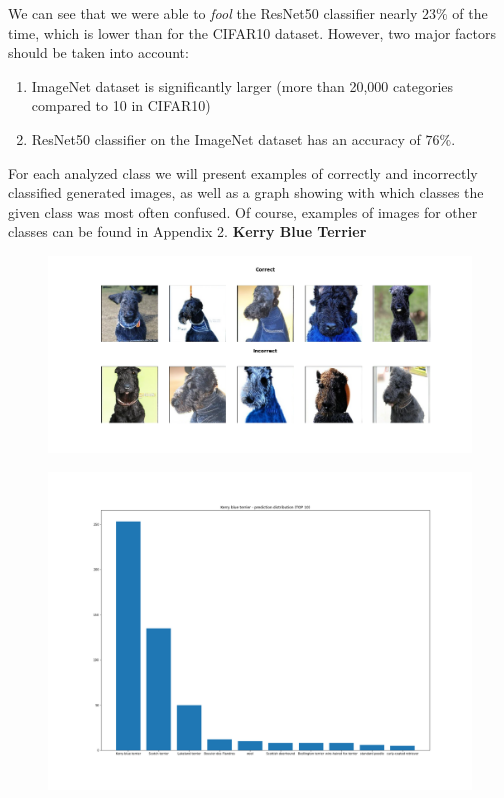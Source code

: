 \documentclass[12pt,a4paper,openany]{book}
\begin{document}
We can see that we were able to \textit{fool} the ResNet50 classifier nearly $23\%$ of the time, which is lower than for the CIFAR10 dataset. However, two major factors should be taken into account:
\begin{enumerate}
\item ImageNet dataset is significantly larger (more than 20,000 categories compared to 10 in CIFAR10)
\item ResNet50 classifier on the ImageNet dataset has an accuracy of $76\%$.
\end{enumerate}
\noindent For each analyzed class we will present examples of correctly and incorrectly classified generated images, as well as a graph showing with which classes the given class was most often confused.  
Of course, examples of images for other classes can be found in Appendix 2.
\newpage
\noindent \textbf{Kerry Blue Terrier} \\
\begin{figure}[ht!]
    \centering
    \includegraphics[scale=0.4]{figs/imagenet_examples/Kerry blue terrier.png}
\end{figure}
\begin{figure}[ht!]
    \centering
    \includegraphics[scale=0.3]{figs/imagenet_examples/Kerry blue terrier_imagenet_dist.png}
\end{figure}
\end{document}
